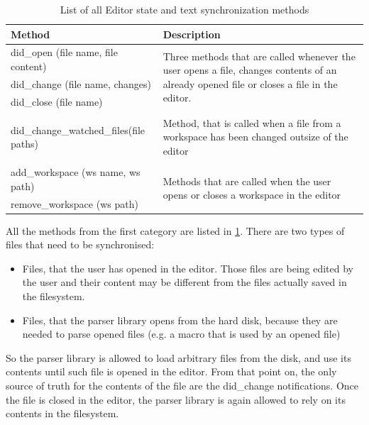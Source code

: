 \begin{table}
	\centering
	\begin{tabular}{ll}
		
		\toprule
		Method & Description \\ \midrule
		did\_open (file name, file content) & \multirow{3}{8cm}{Three methods that are called whenever the user opens a file, changes contents of an already opened file or closes a file in the editor.} \\
		did\_change (file name, changes)& \\
		did\_close (file name)& \\
		& \\
		\multirow{3}{5cm}{did\_change\_watched\_files(file paths)} &\multirow{3}{8cm}{Method, that is called when a file from a workspace has been changed outsize of the editor} \\
		& \\
		& \\
		& \\
		add\_workspace (ws name, ws path) & \multirow{2}{8cm}{Methods that are called when the user opens or closes a workspace in the editor} \\
		remove\_workspace (ws path) & \\ \bottomrule
	\end{tabular}
	
	\caption{List of all Editor state and text synchronization methods}
	\label{text_sync_methods}
\end{table}

All the methods from the first category are listed in \cref{text_sync_methods}. There are two types of files that need to be synchronised:
\begin{itemize}
	\item Files, that the user has opened in the editor. Those files are being edited by the user and their content may be different from the files actually saved in the filesystem.
	\item Files, that the parser library opens from the hard disk, because they are needed to parse opened files (e.g. a macro that is used by an opened file)
\end{itemize}

So the parser library is allowed to load arbitrary files from the disk, and use its contents until such file is opened in the editor. From that point on, the only source of truth for the contents of the file are the did\_change notifications. Once the file is closed in the editor, the parser library is again allowed to rely on its contents in the filesystem.



